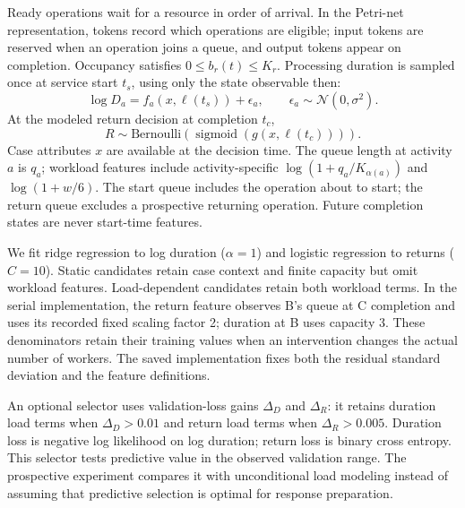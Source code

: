 \documentclass[runningheads]{llncs}
\begin{document}
Ready operations wait for a resource in order of arrival. In the Petri-net representation, tokens record which operations are eligible; input tokens are reserved when an operation joins a queue, and output tokens appear on completion. Occupancy satisfies $0\leq b_r(t)\leq K_r$. Processing duration is sampled once at service start $t_s$, using only the state observable then:
\begin{equation}\label{eq:duration}
\log D_a=f_a(x,\ell(t_s))+\epsilon_a,\qquad \epsilon_a\sim\mathcal N(0,\sigma^2).
\end{equation}
At the modeled return decision at completion $t_c$,
\begin{equation}\label{eq:return}
R\sim\mathrm{Bernoulli}\!\left(\operatorname{sigmoid}(g(x,\ell(t_c)))\right).
\end{equation}
Case attributes $x$ are available at the decision time. The queue length at activity $a$ is $q_a$; workload features include activity-specific $\log(1+q_a/K_{\alpha(a)})$ and $\log(1+w/6)$. The start queue includes the operation about to start; the return queue excludes a prospective returning operation. Future completion states are never start-time features.

We fit ridge regression to log duration ($\alpha=1$) and logistic regression to returns ($C=10$). Static candidates retain case context and finite capacity but omit workload features. Load-dependent candidates retain both workload terms. In the serial implementation, the return feature observes B's queue at C completion and uses its recorded fixed scaling factor 2; duration at B uses capacity 3. These denominators retain their training values when an intervention changes the actual number of workers. The saved implementation fixes both the residual standard deviation and the feature definitions.

An optional selector uses validation-loss gains $\Delta_D$ and $\Delta_R$: it retains duration load terms when $\Delta_D>0.01$ and return load terms when $\Delta_R>0.005$. Duration loss is negative log likelihood on log duration; return loss is binary cross entropy. This selector tests predictive value in the observed validation range. The prospective experiment compares it with unconditional load modeling instead of assuming that predictive selection is optimal for response preparation.
\end{document}
